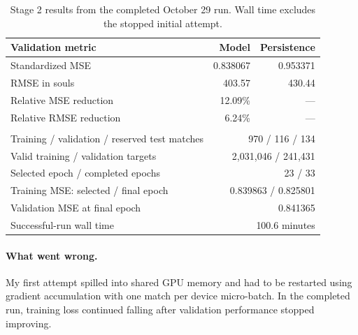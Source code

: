 \documentclass[11pt]{article}
\begin{document}
    \begin{table}[H]
    \centering
    \small
    \renewcommand{\arraystretch}{1.15}
    \begin{tabularx}{\textwidth}{>{\raggedright\arraybackslash}X r r}
    \toprule
    \textbf{Validation metric} & \textbf{Model} & \textbf{Persistence} \\
    \midrule
    Standardized MSE & 0.838067 & 0.953371 \\
    RMSE in souls & 403.57 & 430.44 \\
    Relative MSE reduction & 12.09\% & --- \\
    Relative RMSE reduction & 6.24\% & --- \\
    \midrule
    \multicolumn{3}{l}{\textbf{Run statistics}} \\
    Training / validation / reserved test matches & \multicolumn{2}{r}{970 / 116 / 134} \\
    Valid training / validation targets & \multicolumn{2}{r}{2,031,046 / 241,431} \\
    Selected epoch / completed epochs & \multicolumn{2}{r}{23 / 33} \\
    Training MSE: selected / final epoch & \multicolumn{2}{r}{0.839863 / 0.825801} \\
    Validation MSE at final epoch & \multicolumn{2}{r}{0.841365} \\
    Successful-run wall time & \multicolumn{2}{r}{100.6 minutes} \\
    \bottomrule
    \end{tabularx}
    \caption{Stage 2 results from the completed October 29 run. Wall time excludes
    the stopped initial attempt.}
    \label{tab:dynamics-results}
    \end{table}

    \paragraph{What went wrong.}
    My first attempt spilled into shared GPU memory and had to be restarted
    using gradient accumulation with one match per device micro-batch.
    In the completed run, training loss continued falling after validation
    performance stopped improving.
\end{document}
